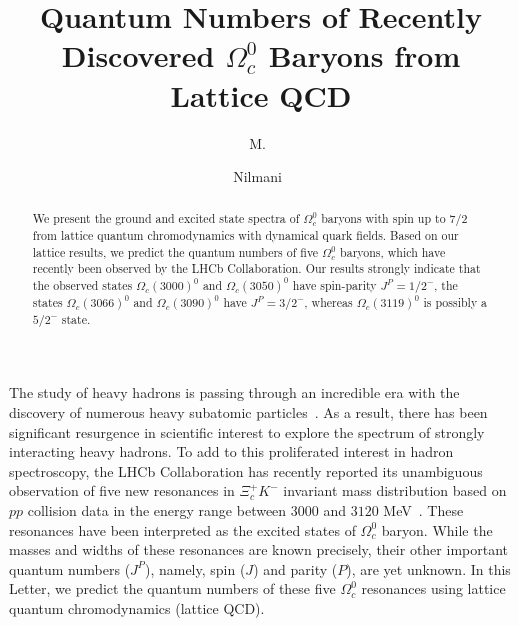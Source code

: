\documentclass[showkeys,aps,twocolumn,showpacs,preprintnumbers,amsmath,amssymb,prd,letterpaper,floatfix,nofootinbib,superscriptaddress,]{revtex4-1}
\begin{document}
\title{Quantum Numbers of Recently Discovered $\Omega^{0}_{c}$ Baryons from Lattice QCD}


\author{M.\ }

\author{Nilmani\ }



\begin{abstract}
We present the ground and excited state spectra of $\Omega^{0}_{c}$ baryons  
with spin up to 7/2  from lattice quantum chromodynamics with
dynamical quark fields. Based on our lattice results, we predict the quantum 
numbers of five $\Omega^{0}_{c}$ baryons, which have recently been observed 
by the LHCb Collaboration. Our results strongly indicate that the observed states 
$\Omega_c(3000)^0$ and $\Omega_c(3050)^0$ have spin-parity $J^P = 1/2^{-}$, 
the states $\Omega_c(3066)^0$ and $\Omega_c(3090)^0$ have $J^P = 3/2^{-}$, 
whereas $\Omega_c(3119)^0$ is possibly a $5/2^{-}$ state.
\end{abstract}
\maketitle

The study of heavy hadrons is passing through an incredible era with
the discovery of numerous heavy subatomic particles~\cite{PDG}. 
As a result, there has been significant
resurgence in scientific interest to explore the spectrum of strongly
interacting heavy hadrons. To add to %
this proliferated interest in hadron spectroscopy, the LHCb
Collaboration has recently reported its unambiguous observation of
five new resonances in $\Xi^{+}_{c}K^{-}$ invariant mass distribution
based on $pp$ collision data in the energy range between 
$3000$ and $3120$ MeV~\cite{Aaij:2017nav}. These resonances have been 
interpreted as the excited states of $\Omega^{0}_{c}$ baryon.
 While the masses and widths of these resonances 
 are known precisely, their other important quantum
numbers ($J^{P}$), namely, spin ($J$) and parity ($P$), are yet unknown.  
In this Letter, we predict the quantum numbers of these five $\Omega^{0}_{c}$
resonances using lattice quantum chromodynamics (lattice QCD).
\end{document}
